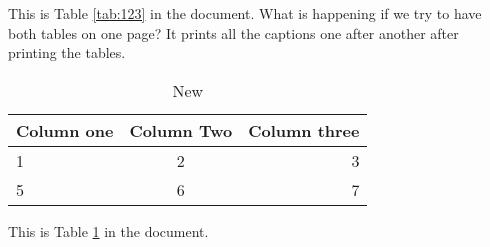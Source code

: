 \documentclass{article}
\begin{document}
This is Table \ref{tab:123} in the document. What is happening if we try to have both tables on one page? It prints all the captions one after another after printing the \cite{book2} tables.

\newpage

\begin{table}
	\begin{tabular}{|l|c|r|}
		\hline
		\textbf{Column one} & \textbf{Column Two} & \textbf{Column three} \\
		\hline
		1 & 2 & 3 \\
		5 & 6 & 7 \\
		\hline
	\end{tabular}
	\caption{New}
	\label{tab:456}
\end{table}

This is Table \ref{tab:456} in the document.

\newpage
\begin{lstlisting}[caption={Your code},label={code:yourcode}]
    % Include your code here
\end{lstlisting}
\newpage



\end{document}
